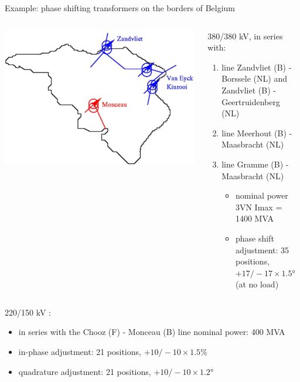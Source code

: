 \begin{frame}[allowframebreaks]{Example: phase shifting transformers on the borders of Belgium}

\begin{columns}
    \begin{column}{0.5\textwidth}
\begin{center}
\includegraphics[width=\textwidth]{images/phase-shifters-be.png}        
\end{center}

    \end{column}
    \begin{column}{0.45\textwidth}
380/380 kV, in series with:
\begin{enumerate}
    \item line Zandvliet (B) - Borssele (NL) and Zandvliet (B) - Geertruidenberg (NL)
    \item line Meerhout (B) - Maasbracht (NL)
    \item line Gramme (B) - Maasbracht (NL)
    \begin{itemize}
        \item nominal power 3VN Imax = 1400 MVA
        \item phase shift adjustment: 35 positions, $+17/-17 \times 1.5°$ (at no load)
    \end{itemize}
\end{enumerate}

    \end{column}
\end{columns}
220/150 kV : 
\begin{itemize}
\item in series with the Chooz (F) - Monceau (B) line nominal power: 400 MVA
\item in-phase adjustment: 21 positions, $+10/-10 \times 1.5 \% $
\item quadrature adjustment: 21 positions, $+10/-10 \times 1.2°$
\end{itemize}

\end{frame}

